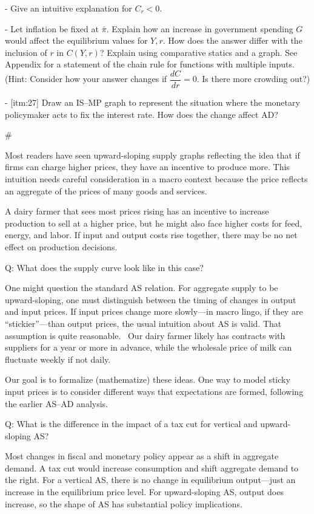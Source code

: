﻿\documentclass[oneside]{book}
\begin{document}
- Give an intuitive explanation for $C_{r}<0$.

- Let inflation be fixed at $\bar{\pi}$. Explain how an increase in
government spending $G$ would affect the equilibrium values for $Y,r$. How does
the answer differ with the inclusion of $r$ in $C( Y,r) $?
Explain using comparative statics and a graph. See Appendix  for a
statement of the chain rule for functions with multiple inputs. (Hint:
Consider how your answer changes if $\dfrac{dC}{dr}=0$. Is there more
crowding out?)

- [itm:27] Draw an IS--MP graph to represent the situation where the monetary
policymaker acts to fix the interest rate. How does the change affect AD?



#



Most readers have seen upward-sloping supply graphs reflecting the idea that if
firms can charge higher prices, they have an incentive to produce more. This intuition needs careful consideration in a macro context because the price
reflects an aggregate of the prices of many goods and services.

A dairy farmer that sees most prices rising has an incentive to increase production to sell at a higher price, but he might also face higher costs for
feed, energy, and labor. If input and output costs rise together, there
may be no net effect on production decisions.

Q: What does the supply curve look like in this case?

One might question the standard AS relation. For aggregate
supply to be upward-sloping, one must distinguish between the timing
of changes in output and input prices. If input prices change more slowly---in macro lingo, if they are ``stickier''---than output prices, the usual intuition about AS is valid. That assumption is quite reasonable. \
Our dairy farmer likely has contracts with suppliers for a year or more in
advance, while the wholesale price of milk can fluctuate weekly if not
daily.

Our goal is to formalize (mathematize) these ideas. One way to model
sticky input prices is to consider different ways that expectations are formed,
following the earlier AS--AD analysis. \

Q: What is the difference in the impact of a tax cut for vertical and
upward-sloping AS?

Most changes in fiscal and monetary policy appear as a shift in aggregate
demand. A tax cut would increase consumption and shift aggregate demand to
the right. For a vertical AS, there is no change in equilibrium output---just an increase in the equilibrium price level. For upward-sloping AS, output does increase, so the shape of AS has substantial policy implications.
\end{document}
